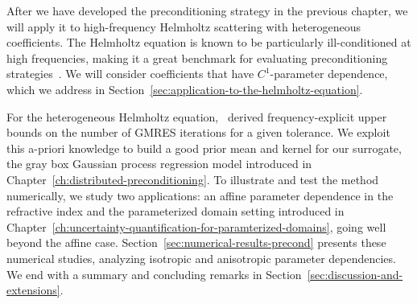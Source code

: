 After we have developed the preconditioning strategy in the previous chapter, we will apply it to high-frequency Helmholtz scattering
with heterogeneous coefficients.
The Helmholtz equation is known to be particularly ill-conditioned at high frequencies, making it a great benchmark for evaluating preconditioning strategies~\cite{chandler-wilde2012,graham2021}.
We will consider coefficients that have $C^1$-parameter dependence, which we address in Section~\ref{sec:application-to-the-helmholtz-equation}.

For the heterogeneous Helmholtz equation,~\cite{graham2021} derived fre\-quen\-cy{-}ex\-pli\-cit upper bounds on the number of GMRES iterations for a given tolerance.
We exploit this a-priori knowledge to build a good prior mean and kernel for our surrogate, the gray box Gaussian process regression model introduced in Chapter~\ref{ch:distributed-preconditioning}.
To illustrate and test the method numerically, we study two applications: an affine parameter dependence in the refractive index and the parameterized domain setting introduced in Chapter~\ref{ch:uncertainty-quantification-for-paramterized-domains}, going well beyond the affine case.
Section~\ref{sec:numerical-results-precond} presents these numerical studies, analyzing isotropic and anisotropic parameter dependencies.
We end with a summary and concluding remarks in Section~\ref{sec:discussion-and-extensions}.
